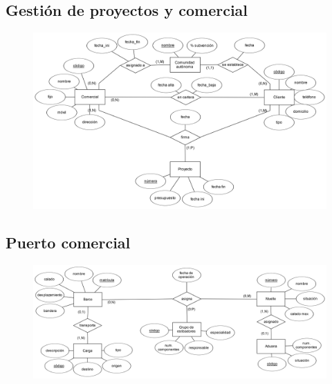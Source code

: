 \documentclass{db-practice}
\begin{document}
\subsection{Gestión de proyectos y comercial}
\begin{figure}[H]
    \centering
    \includegraphics[width=\textwidth]{figs/modelado/ejercicio-16}
\end{figure}

\subsection{Puerto comercial}
\begin{figure}[H]
    \centering
    \includegraphics[width=\textwidth]{figs/modelado/ejercicio-17}
\end{figure}
\end{document}
